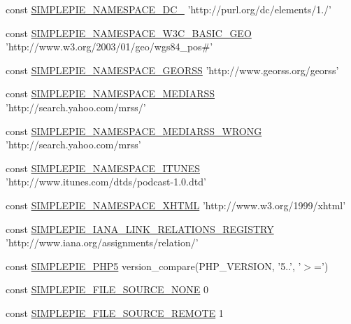 \begin{DoxyCompactItemize}
\item 
const \hyperlink{simplepie_8inc_a96fec98542c11980776fef2172192198}{S\-I\-M\-P\-L\-E\-P\-I\-E\-\_\-\-N\-A\-M\-E\-S\-P\-A\-C\-E\-\_\-\-D\-C\-\_} 'http\-://purl.\-org/dc/elements/1./'
\item 
const \hyperlink{simplepie_8inc_a263da668da50013c79f5df3d27635e58}{S\-I\-M\-P\-L\-E\-P\-I\-E\-\_\-\-N\-A\-M\-E\-S\-P\-A\-C\-E\-\_\-\-W3\-C\-\_\-\-B\-A\-S\-I\-C\-\_\-\-G\-E\-O} 'http\-://www.\-w3.\-org/2003/01/geo/wgs84\-\_\-pos\#'
\item 
const \hyperlink{simplepie_8inc_a627614340191436af0ece34cf43d369e}{S\-I\-M\-P\-L\-E\-P\-I\-E\-\_\-\-N\-A\-M\-E\-S\-P\-A\-C\-E\-\_\-\-G\-E\-O\-R\-S\-S} 'http\-://www.\-georss.\-org/georss'
\item 
const \hyperlink{simplepie_8inc_a842afeae791c74d2aab19438bf6f3f55}{S\-I\-M\-P\-L\-E\-P\-I\-E\-\_\-\-N\-A\-M\-E\-S\-P\-A\-C\-E\-\_\-\-M\-E\-D\-I\-A\-R\-S\-S} 'http\-://search.\-yahoo.\-com/mrss/'
\item 
const \hyperlink{simplepie_8inc_a0966d98d59b93000ccffc0aef28e2863}{S\-I\-M\-P\-L\-E\-P\-I\-E\-\_\-\-N\-A\-M\-E\-S\-P\-A\-C\-E\-\_\-\-M\-E\-D\-I\-A\-R\-S\-S\-\_\-\-W\-R\-O\-N\-G} 'http\-://search.\-yahoo.\-com/mrss'
\item 
const \hyperlink{simplepie_8inc_a9bf48f20384caed72408017d3e52a1a5}{S\-I\-M\-P\-L\-E\-P\-I\-E\-\_\-\-N\-A\-M\-E\-S\-P\-A\-C\-E\-\_\-\-I\-T\-U\-N\-E\-S} 'http\-://www.\-itunes.\-com/dtds/podcast-\/1.\-0.dtd'
\item 
const \hyperlink{simplepie_8inc_aac4638a4c4b3b51173fba14c1bd85349}{S\-I\-M\-P\-L\-E\-P\-I\-E\-\_\-\-N\-A\-M\-E\-S\-P\-A\-C\-E\-\_\-\-X\-H\-T\-M\-L} 'http\-://www.\-w3.\-org/1999/xhtml'
\item 
const \hyperlink{simplepie_8inc_a81f5d67cc740cdbb60287f3975560db4}{S\-I\-M\-P\-L\-E\-P\-I\-E\-\_\-\-I\-A\-N\-A\-\_\-\-L\-I\-N\-K\-\_\-\-R\-E\-L\-A\-T\-I\-O\-N\-S\-\_\-\-R\-E\-G\-I\-S\-T\-R\-Y} 'http\-://www.\-iana.\-org/assignments/relation/'
\item 
const \hyperlink{simplepie_8inc_a03fac81dd4e3a8e055d35e5e33b5d9d7}{S\-I\-M\-P\-L\-E\-P\-I\-E\-\_\-\-P\-H\-P5} version\-\_\-compare(P\-H\-P\-\_\-\-V\-E\-R\-S\-I\-O\-N, '5..', '$>$=')
\item 
const \hyperlink{simplepie_8inc_a29c651a605663acf38e6f86829604865}{S\-I\-M\-P\-L\-E\-P\-I\-E\-\_\-\-F\-I\-L\-E\-\_\-\-S\-O\-U\-R\-C\-E\-\_\-\-N\-O\-N\-E} 0
\item 
const \hyperlink{simplepie_8inc_a8844529bf161b24b5a527e33f4e0b624}{S\-I\-M\-P\-L\-E\-P\-I\-E\-\_\-\-F\-I\-L\-E\-\_\-\-S\-O\-U\-R\-C\-E\-\_\-\-R\-E\-M\-O\-T\-E} 1

\end{DoxyCompactItemize}
